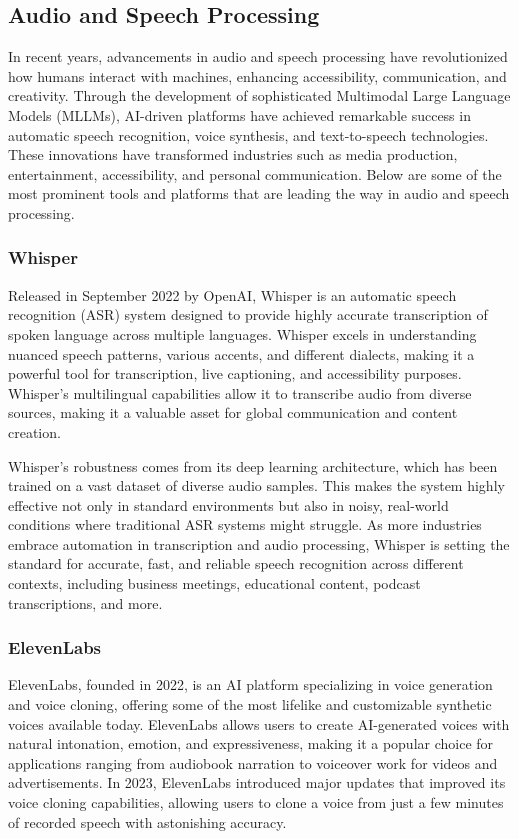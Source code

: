 \subsection{Audio and Speech Processing}

In recent years, advancements in audio and speech processing have revolutionized how humans interact with machines, enhancing accessibility, communication, and creativity. 
Through the development of sophisticated Multimodal Large Language Models (MLLMs), AI-driven platforms have achieved remarkable success in automatic speech recognition, voice synthesis, and text-to-speech technologies. 
These innovations have transformed industries such as media production, entertainment, accessibility, and personal communication. 
Below are some of the most prominent tools and platforms that are leading the way in audio and speech processing.

\subsubsection{Whisper}

Released in September 2022 by OpenAI, Whisper is an automatic speech recognition (ASR) system designed to provide highly accurate transcription of spoken language across multiple languages. 
Whisper excels in understanding nuanced speech patterns, various accents, and different dialects, making it a powerful tool for transcription, live captioning, and accessibility purposes. 
Whisper’s multilingual capabilities allow it to transcribe audio from diverse sources, making it a valuable asset for global communication and content creation.

Whisper’s robustness comes from its deep learning architecture, which has been trained on a vast dataset of diverse audio samples. 
This makes the system highly effective not only in standard environments but also in noisy, real-world conditions where traditional ASR systems might struggle. 
As more industries embrace automation in transcription and audio processing, Whisper is setting the standard for accurate, fast, and reliable speech recognition across different contexts, including business meetings, educational content, podcast transcriptions, and more.

\subsubsection{ElevenLabs}

ElevenLabs, founded in 2022, is an AI platform specializing in voice generation and voice cloning, offering some of the most lifelike and customizable synthetic voices available today. 
ElevenLabs allows users to create AI-generated voices with natural intonation, emotion, and expressiveness, making it a popular choice for applications ranging from audiobook narration to voiceover work for videos and advertisements. 
In 2023, ElevenLabs introduced major updates that improved its voice cloning capabilities, allowing users to clone a voice from just a few minutes of recorded speech with astonishing accuracy.

